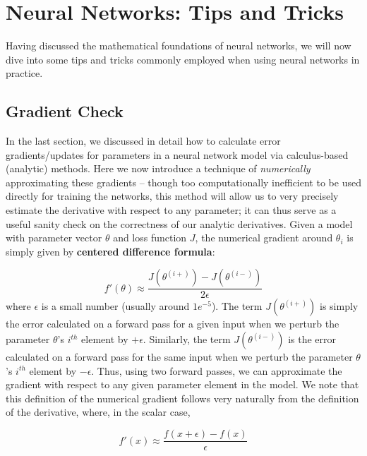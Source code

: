 \documentclass{tufte-handout}
\begin{document}
\section{Neural Networks: Tips and Tricks}\label{sec:nnetstips}

Having discussed the mathematical foundations of neural networks, we will now dive into some tips and tricks commonly employed when using neural networks in practice.

\subsection{Gradient Check}
In the last section, we discussed in detail how to calculate error gradients/updates for parameters in a neural network model via calculus-based (analytic) methods. Here we now introduce a technique of \textit{numerically} approximating these gradients -- though too computationally inefficient to be used directly for training the networks, this method will allow us to very precisely estimate the derivative with respect to any parameter; it can thus serve as a useful sanity check on the correctness of our analytic derivatives. Given a model with parameter vector $\theta$ and loss function $J$, the numerical gradient around $\theta_i$ is simply given by \textbf{centered difference formula}:

$$ f'(\theta) \approx \frac{J(\theta^{(i+)}) - J(\theta^{(i-)})}{2 \epsilon}$$
where $\epsilon$ is a small number (usually around $1e^{-5}$). The term $J(\theta^{(i+)})$ is simply the error calculated on a forward pass for a given input when we perturb the parameter $\theta$'s $i^{th}$ element by $+\epsilon$. Similarly, the term $J(\theta^{(i-)})$ is the error calculated on a forward pass for the same input when we perturb the parameter $\theta$'s $i^{th}$ element by $-\epsilon$. Thus, using two forward passes, we can approximate the gradient with respect to any given parameter element in the model. We note that this definition of the numerical gradient follows very naturally from the definition of the derivative, where, in the scalar case,

$$f'(x) \approx \dfrac{f(x + \epsilon) - f(x)}{\epsilon}$$

\end{document}

